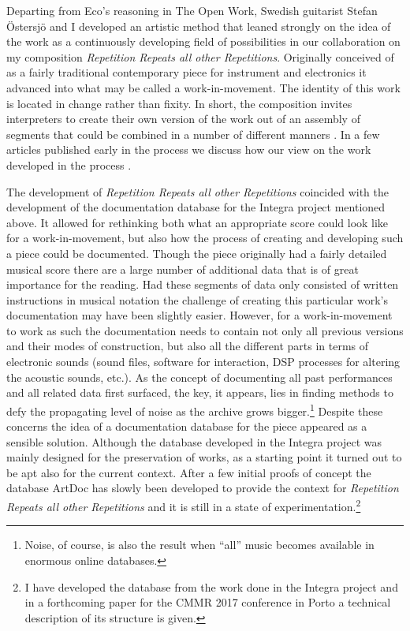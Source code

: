 \documentclass[11pt,a4paper]{article}
\begin{document}
Departing from Eco's reasoning in The Open Work, Swedish guitarist Stefan Östersjö and I developed an artistic method that leaned strongly on the idea of the work as a continuously developing field of possibilities in our collaboration on my composition \emph{Repetition Repeats all other Repetitions}. Originally conceived of as a fairly traditional contemporary piece for instrument and electronics it advanced into what may be called a work-in-movement. The identity of this work is located in change rather than fixity. In short, the composition invites interpreters to create their own version of the work out of an assembly of segments that could be combined in a number of different manners \citep{friskcoessens2013}. In a few articles published early in the process we discuss how our view on the work developed in the process \citep{frisk-ost06,frisk-ost06-2}.

The development of \emph{Repetition Repeats all other Repetitions} coincided with the development of the documentation database for the Integra project mentioned above. It allowed for rethinking both what an appropriate score could look like for a work-in-movement, but also how the process of creating and developing such a piece could be documented. Though the piece originally had a fairly detailed musical score there are a large number of additional data that is of great importance for the reading. Had these segments of data only consisted of written instructions in musical notation the challenge of creating this particular work's documentation may have been slightly easier. However, for a work-in-movement to work as such the documentation needs to contain not only all previous versions and their modes of construction, but also all the different parts in terms of electronic sounds (sound files, software for interaction, DSP processes for altering the acoustic sounds, etc.). As the concept of documenting all past performances and all related data first surfaced, the key, it appears, lies in finding methods to defy the propagating level of noise as the archive grows bigger.\footnote{Noise, of course, is also the result when ``all'' music becomes available in enormous online databases.} Despite these concerns the idea of a documentation database for the piece appeared as a sensible solution. Although the database developed in the Integra project was mainly designed for the preservation of works, as a starting point it turned out to be apt also for the current context. After a few initial proofs of concept the database ArtDoc has slowly been developed to provide the context for \emph{Repetition Repeats all other Repetitions} and it is still in a state of experimentation.\footnote{I have developed the database from the work done in the Integra project and in a forthcoming paper for the CMMR 2017 conference in Porto a technical description of its structure is given.}
\end{document}
